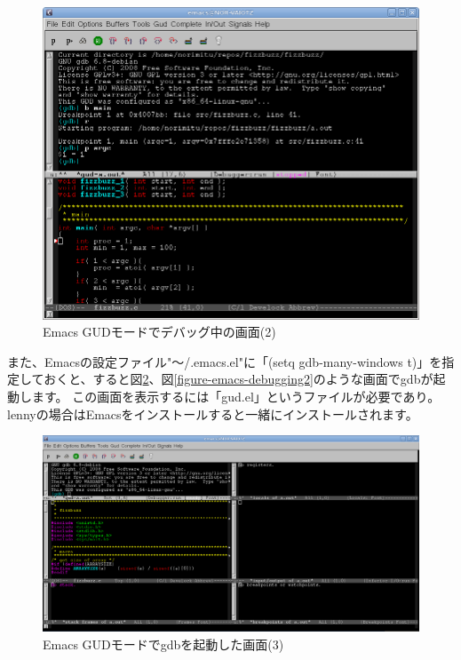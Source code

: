 \documentclass[mingoth,a4paper]{jsarticle}
\begin{document}
\begin{figure}[H]
\begin{center}
\includegraphics[scale=0.5]{image200910/gdb-emacs-gud2.png}
\caption{Emacs GUDモードでデバッグ中の画面(2)}\label{figure-emacs-debugging1}
\end{center}
\end{figure}


また、Emacsの設定ファイル"〜/.emacs.el"に「(setq gdb-many-windows t)」を指定しておくと、すると図\ref{figure-emacs-gud2}、図\ref{figure-emacs-debugging2}のような画面でgdbが起動します。
この画面を表示するには「gud.el」というファイルが必要であり。lennyの場合はEmacsをインストールすると一緒にインストールされます。

\begin{figure}[H]
\begin{center}
\includegraphics[scale=0.5]{image200910/gdb-emacs-gud3.png}
\caption{Emacs GUDモードでgdbを起動した画面(3)}\label{figure-emacs-gud2}
\end{center}
\end{figure}
\end{document}
